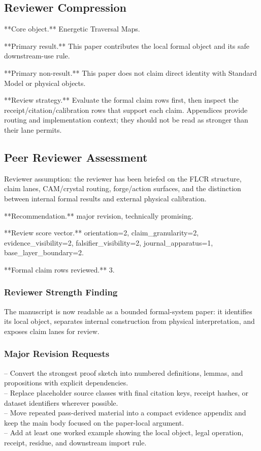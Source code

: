 \documentclass[11pt]{article}
\begin{document}
\subsection*{Reviewer Compression}

**Core object.** Energetic Traversal Maps.

**Primary result.** This paper contributes the local formal object and its safe downstream-use rule.

**Primary non-result.** This paper does not claim direct identity with Standard Model or physical objects.

**Review strategy.** Evaluate the formal claim rows first, then inspect the receipt/citation/calibration rows that support each claim. Appendices provide routing and implementation context; they should not be read as stronger than their lane permits.

\subsection*{Peer Reviewer Assessment}

Reviewer assumption: the reviewer has been briefed on the FLCR structure, claim lanes, CAM/crystal routing, forge/action surfaces, and the distinction between internal formal results and external physical calibration.

**Recommendation.** major revision, technically promising.

**Review score vector.** orientation=2, claim\_granularity=2, evidence\_visibility=2, falsifier\_visibility=2, journal\_apparatus=1, base\_layer\_boundary=2.

**Formal claim rows reviewed.** 3.

\subsubsection*{Reviewer Strength Finding}

The manuscript is now readable as a bounded formal-system paper: it identifies its local object, separates internal construction from physical interpretation, and exposes claim lanes for review.

\subsubsection*{Major Revision Requests}

\noindent{}-- Convert the strongest proof sketch into numbered definitions, lemmas, and propositions with explicit dependencies.\\
\noindent{}-- Replace placeholder source classes with final citation keys, receipt hashes, or dataset identifiers wherever possible.\\
\noindent{}-- Move repeated pass-derived material into a compact evidence appendix and keep the main body focused on the paper-local argument.\\
\noindent{}-- Add at least one worked example showing the local object, legal operation, receipt, residue, and downstream import rule.\\
\end{document}
